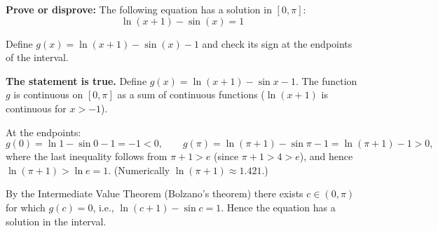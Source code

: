 
\begin{question}
\textbf{Prove or disprove:} The following equation has a solution in $[0,\pi]$:
\[ \ln(x+1)-\sin(x)=1 \]
\end{question}

\begin{hint}
Define $g(x)=\ln(x+1)-\sin(x)-1$ and check its sign at the endpoints of the interval.
\end{hint}

\begin{solution}
\textbf{The statement is true.} Define $g(x)=\ln(x+1)-\sin x-1$. The function $g$ is continuous on $[0,\pi]$ as a sum of continuous functions ($\ln(x+1)$ is continuous for $x>-1$).

At the endpoints:
\[ g(0)=\ln1-\sin0-1=-1<0,\qquad g(\pi)=\ln(\pi+1)-\sin\pi-1=\ln(\pi+1)-1>0, \]
where the last inequality follows from $\pi+1>e$ (since $\pi+1>4>e$), and hence $\ln(\pi+1)>\ln e=1$. (Numerically $\ln(\pi+1)\approx1.421$.)

By the Intermediate Value Theorem (Bolzano's theorem) there exists $c\in(0,\pi)$ for which $g(c)=0$, i.e., $\ln(c+1)-\sin c=1$. Hence the equation has a solution in the interval.
\end{solution}
